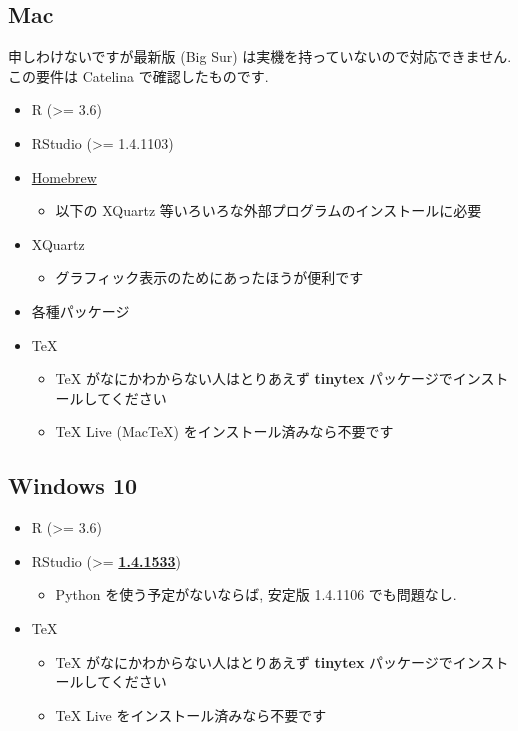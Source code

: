 \documentclass[
]{ltjsarticle}
\providecommand{\tightlist}{%
  \setlength{\itemsep}{0pt}\setlength{\parskip}{0pt}}
\begin{document}
\hypertarget{mac}{%
\subsection{Mac}\label{mac}}

申しわけないですが最新版 (Big Sur) は実機を持っていないので対応できません. この要件は Catelina で確認したものです.

\begin{itemize}
\tightlist
\item
  R (\textgreater= 3.6)
\item
  RStudio (\textgreater= 1.4.1103)
\item
  \href{https://brew.sh/index_ja}{Homebrew}

  \begin{itemize}
  \tightlist
  \item
    以下の XQuartz 等いろいろな外部プログラムのインストールに必要
  \end{itemize}
\item
  XQuartz

  \begin{itemize}
  \tightlist
  \item
    グラフィック表示のためにあったほうが便利です
  \end{itemize}
\item
  各種パッケージ
\item
  TeX

  \begin{itemize}
  \tightlist
  \item
    TeX がなにかわからない人はとりあえず \textbf{tinytex} パッケージでインストールしてください
  \item
    TeX Live (MacTeX) をインストール済みなら不要です
  \end{itemize}
\end{itemize}

\hypertarget{windows-10}{%
\subsection{Windows 10}\label{windows-10}}

\begin{itemize}
\tightlist
\item
  R (\textgreater= 3.6)
\item
  RStudio (\textgreater= \href{https://dailies.rstudio.com/rstudio/oss/windows/}{\textbf{1.4.1533}})

  \begin{itemize}
  \tightlist
  \item
    Python を使う予定がないならば, 安定版 1.4.1106 でも問題なし.
  \end{itemize}
\item
  TeX

  \begin{itemize}
  \tightlist
  \item
    TeX がなにかわからない人はとりあえず \textbf{tinytex} パッケージでインストールしてください
  \item
    TeX Live をインストール済みなら不要です
  \end{itemize}
\end{itemize}
\end{document}

